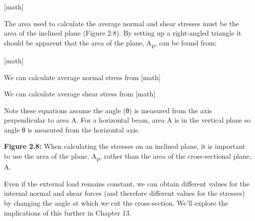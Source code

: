 \documentclass[
  letterpaper,
  DIV=11,
  numbers=noendperiod]{scrreprt}
\begin{document}
{[}math{]}

The area used to calculate the average normal and shear stresses must be
the area of the inclined plane (Figure 2.8). By setting up a
right-angled triangle it should be apparent that the area of the plane,
A\textsubscript{p}, can be found from:

{[}math{]}

We can calculate average normal stress from {[}math{]}

We can calculate average shear stress from {[}math{]}

Note these equations assume the angle (θ) is measured from the axis
perpendicular to area A. For a horizontal beam, area A is in the
vertical plane so angle θ is measured from the horizontal axis.

\textbf{Figure 2.8:} When calculating the stresses on an inclined plane,
it is important to use the area of the plane, A\textsubscript{p}, rather
than the area of the cross-sectional plane, A.

Even if the external load remains constant, we can obtain different
values for the internal normal and shear forces (and therefore different
values for the stresses) by changing the angle at which we cut the
cross-section. We'll explore the implications of this further in Chapter
13.
\end{document}
